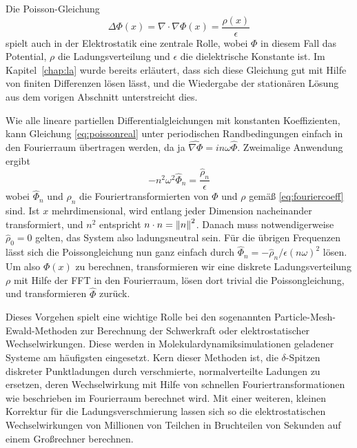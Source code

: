 Die Poisson-Gleichung
\begin{equation}
  \label{eq:poissonreal}
  \Delta  \Phi(x) = \nabla \cdot \nabla \Phi(x)  = \frac{\rho(x)}{\epsilon}
\end{equation}
spielt auch in der Elektrostatik eine zentrale Rolle, wobei $\Phi$ in
diesem Fall das Potential, $\rho$ die Ladungsverteilung und $\epsilon$
die dielektrische Konstante ist. Im Kapitel~\ref{chap:la} wurde
bereits erläutert, dass sich diese Gleichung gut mit Hilfe von
finiten Differenzen lösen lässt, und die Wiedergabe der stationären
Lösung aus dem vorigen Abschnitt unterstreicht dies.

Wie alle lineare partiellen Differentialgleichungen mit konstanten
Koeffizienten, kann Gleichung \eqref{eq:poissonreal} unter
periodischen Randbedingungen einfach in den Fourierraum übertragen
werden, da ja $\widehat{\nabla \Phi} = i n \omega \hat \Phi$. Zweimalige
Anwendung ergibt
\begin{equation}
  \label{eq:poissonft}
  -n^2\omega^2\hat\Phi_n  = \frac{\hat\rho_n}{\epsilon}
\end{equation}
wobei $\hat\Phi_n$ und $\hat\rho_n$ die Fouriertransformierten von
$\Phi$ und $\rho$ gemäß \eqref{eq:fouriercoeff} sind. Ist $x$
mehrdimensional, wird entlang jeder Dimension nacheinander
transformiert, und $n^2$ entspricht $n\cdot n = \left\lVert{n}\right\rVert^2$. Danach muss
notwendigerweise $\hat\rho_0 = 0$ gelten, das System also
ladungsneutral sein. Für die übrigen Frequenzen lässt sich die
Poissongleichung nun ganz einfach durch $\hat\Phi_n =
-\hat\rho_n/\epsilon(n\omega)^2$ lösen. Um also $\Phi(x)$ zu berechnen,
transformieren wir eine diskrete Ladungsverteilung $\rho$ mit Hilfe
der FFT in den Fourierraum, lösen dort trivial die Poissongleichung,
und transformieren $\hat\Phi$ zurück.

%

Dieses Vorgehen spielt eine wichtige Rolle bei den sogenannten
Particle-Mesh-Ewald-Methoden zur Berechnung der Schwerkraft oder
elektrostatischer Wechselwirkungen. Diese werden in
Molekulardynamiksimulationen geladener Systeme am häufigsten
eingesetzt. Kern dieser Methoden ist, die $\delta$-Spitzen diskreter
Punktladungen durch verschmierte, normalverteilte Ladungen zu
ersetzen, deren Wechselwirkung mit Hilfe von schnellen
Fouriertransformationen wie beschrieben im Fourierraum berechnet
wird. Mit einer weiteren, kleinen Korrektur für die
Ladungsverschmierung lassen sich so die elektrostatischen
Wechselwirkungen von Millionen von Teilchen in Bruchteilen von
Sekunden auf einem Großrechner berechnen.

